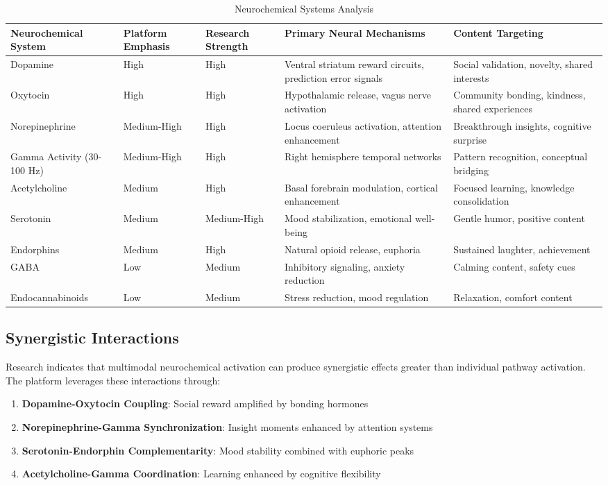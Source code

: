 \documentclass{article}
\begin{document}
\begin{table}[h]
\centering
\caption{Neurochemical Systems Analysis}
\label{tab:neurochemical}
\begin{tabular}{|p{3cm}|p{2cm}|p{2cm}|p{4cm}|p{3cm}|}
\hline
\textbf{Neurochemical System} & \textbf{Platform Emphasis} & \textbf{Research Strength} & \textbf{Primary Neural Mechanisms} & \textbf{Content Targeting} \\
\hline
Dopamine & High & High & Ventral striatum reward circuits, prediction error signals & Social validation, novelty, shared interests \\
\hline
Oxytocin & High & High & Hypothalamic release, vagus nerve activation & Community bonding, kindness, shared experiences \\
\hline
Norepinephrine & Medium-High & High & Locus coeruleus activation, attention enhancement & Breakthrough insights, cognitive surprise \\
\hline
Gamma Activity (30-100 Hz) & Medium-High & High & Right hemisphere temporal networks & Pattern recognition, conceptual bridging \\
\hline
Acetylcholine & Medium & High & Basal forebrain modulation, cortical enhancement & Focused learning, knowledge consolidation \\
\hline
Serotonin & Medium & Medium-High & Mood stabilization, emotional well-being & Gentle humor, positive content \\
\hline
Endorphins & Medium & High & Natural opioid release, euphoria & Sustained laughter, achievement \\
\hline
GABA & Low & Medium & Inhibitory signaling, anxiety reduction & Calming content, safety cues \\
\hline
Endocannabinoids & Low & Medium & Stress reduction, mood regulation & Relaxation, comfort content \\
\hline
\end{tabular}
\end{table}

\subsection{Synergistic Interactions}

Research indicates that multimodal neurochemical activation can produce synergistic effects greater than individual pathway activation. The platform leverages these interactions through:

\begin{enumerate}
    \item \textbf{Dopamine-Oxytocin Coupling}: Social reward amplified by bonding hormones
    \item \textbf{Norepinephrine-Gamma Synchronization}: Insight moments enhanced by attention systems
    \item \textbf{Serotonin-Endorphin Complementarity}: Mood stability combined with euphoric peaks
    \item \textbf{Acetylcholine-Gamma Coordination}: Learning enhanced by cognitive flexibility
\end{enumerate}
\end{document}
